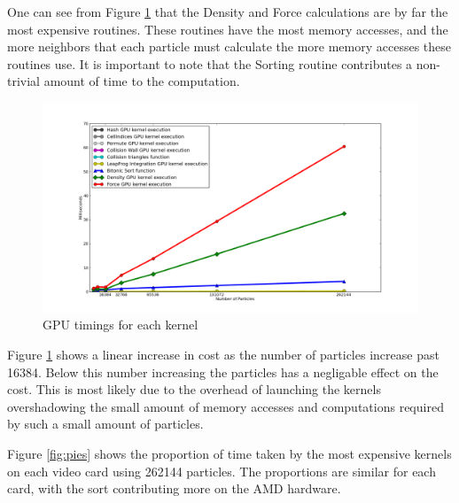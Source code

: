 One can see from Figure \ref{fig:kernel_time} that the Density and Force calculations are by far
the most expensive routines. These routines have the most memory accesses, and
the more neighbors that each particle must calculate the more memory accesses
these routines use. It is important to note that the Sorting routine
contributes a non-trivial amount of time to the computation.


\begin{figure}[!htc]
 		\centering
		\includegraphics[scale=0.4]{figures/nv_kernel_num.png}
        \caption{ GPU timings for each kernel }
        \label{fig:kernel_time}
\end{figure}

Figure \ref{fig:kernel_time} shows a linear increase in cost as the number of
particles increase past 16384. Below this number increasing the particles has a
negligable effect on the cost. This is most likely due to the overhead of
launching the kernels overshadowing the small amount of memory accesses and
computations required by such a small amount of particles. 

\pagebreak

Figure \ref{fig:pies} shows the proportion of time taken by the most expensive
kernels on each video card using 262144 particles. The proportions are similar
for each card, with the sort contributing more on the AMD hardware.

